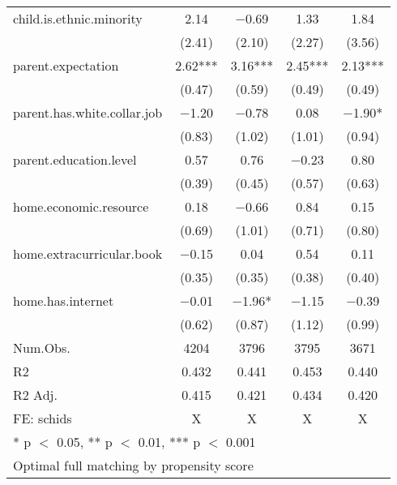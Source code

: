 \documentclass[
  man]{apa7}
\begin{document}
\begin{table}
\begin{tabular}[t]{lcccc}
child.is.ethnic.minority & \num{2.14} & \num{-0.69} & \num{1.33} & \num{1.84}\\
 & (\num{2.41}) & (\num{2.10}) & (\num{2.27}) & (\num{3.56})\\
parent.expectation & \num{2.62}*** & \num{3.16}*** & \num{2.45}*** & \num{2.13}***\\
 & (\num{0.47}) & (\num{0.59}) & (\num{0.49}) & (\num{0.49})\\
parent.has.white.collar.job & \num{-1.20} & \num{-0.78} & \num{0.08} & \num{-1.90}*\\
 & (\num{0.83}) & (\num{1.02}) & (\num{1.01}) & (\num{0.94})\\
parent.education.level & \num{0.57} & \num{0.76} & \num{-0.23} & \num{0.80}\\
 & (\num{0.39}) & (\num{0.45}) & (\num{0.57}) & (\num{0.63})\\
home.economic.resource & \num{0.18} & \num{-0.66} & \num{0.84} & \num{0.15}\\
 & (\num{0.69}) & (\num{1.01}) & (\num{0.71}) & (\num{0.80})\\
home.extracurricular.book & \num{-0.15} & \num{0.04} & \num{0.54} & \num{0.11}\\
 & (\num{0.35}) & (\num{0.35}) & (\num{0.38}) & (\num{0.40})\\
home.has.internet & \num{-0.01} & \num{-1.96}* & \num{-1.15} & \num{-0.39}\\
 & (\num{0.62}) & (\num{0.87}) & (\num{1.12}) & (\num{0.99})\\
\midrule
Num.Obs. & \num{4204} & \num{3796} & \num{3795} & \num{3671}\\
R2 & \num{0.432} & \num{0.441} & \num{0.453} & \num{0.440}\\
R2 Adj. & \num{0.415} & \num{0.421} & \num{0.434} & \num{0.420}\\
FE: schids & X & X & X & X\\
\bottomrule
\multicolumn{5}{l}{\rule{0pt}{1em}* p $<$ 0.05, ** p $<$ 0.01, *** p $<$ 0.001}\\
\multicolumn{5}{l}{\rule{0pt}{1em}Optimal full matching by propensity score}\\
\end{tabular}
\end{table}
\end{document}
